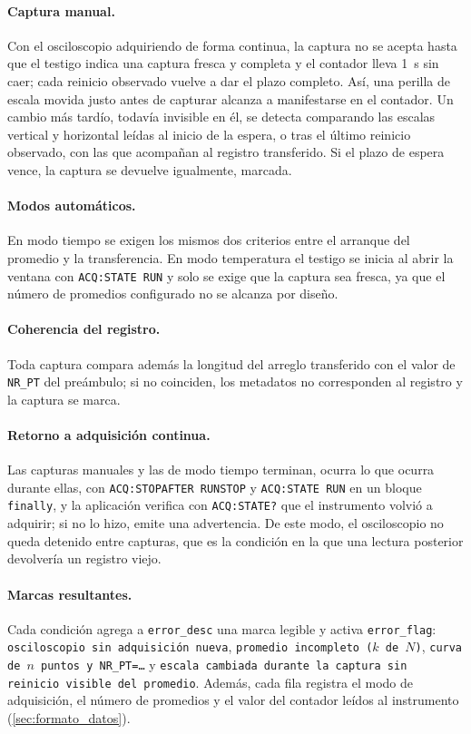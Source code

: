 \paragraph{Captura manual.} Con el osciloscopio adquiriendo de forma
continua, la captura no se acepta hasta que el testigo indica una
captura fresca y completa y el contador lleva \SI{1}{\second} sin
caer; cada reinicio observado vuelve a dar el plazo completo. Así, una
perilla de escala movida justo antes de capturar alcanza a manifestarse
en el contador. Un cambio más tardío, todavía invisible en él, se
detecta comparando las escalas vertical y horizontal leídas al inicio
de la espera, o tras el último reinicio observado, con las que
acompañan al registro transferido. Si el plazo de espera vence, la
captura se devuelve igualmente, marcada.

\paragraph{Modos automáticos.} En modo tiempo se exigen los mismos dos
criterios entre el arranque del promedio y la transferencia. En modo
temperatura el testigo se inicia al abrir la ventana con
\texttt{ACQ:STATE RUN} y solo se exige que la captura sea fresca, ya
que el número de promedios configurado no se alcanza por diseño.

\paragraph{Coherencia del registro.} Toda captura compara además la
longitud del arreglo transferido con el valor de \texttt{NR\_PT} del
preámbulo; si no coinciden, los metadatos no corresponden al registro
y la captura se marca.

\paragraph{Retorno a adquisición continua.} Las capturas manuales y
las de modo tiempo terminan, ocurra lo que ocurra durante ellas, con
\texttt{ACQ:STOPAFTER RUNSTOP} y \texttt{ACQ:STATE RUN} en un bloque
\texttt{finally}, y la aplicación verifica con \texttt{ACQ:STATE?} que
el instrumento volvió a adquirir; si no lo hizo, emite una advertencia.
De este modo, el osciloscopio no queda detenido entre capturas, que es
la condición en la que una lectura posterior devolvería un registro
viejo.

\paragraph{Marcas resultantes.} Cada condición agrega a
\texttt{error\_desc} una marca legible y activa \texttt{error\_flag}:
\texttt{osciloscopio sin adquisición nueva}, \texttt{promedio
incompleto ($k$ de $N$)}, \texttt{curva de $n$ puntos y NR\_PT=\ldots}
y \texttt{escala cambiada durante la captura sin reinicio visible del
promedio}. Además, cada fila registra el modo de adquisición, el
número de promedios y el valor del contador leídos al instrumento
(\cref{sec:formato_datos}).

